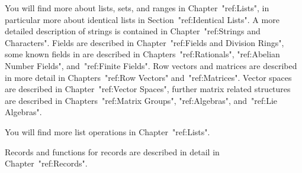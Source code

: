 \null

% 
% 
You will find more about lists, sets, and ranges in Chapter~"ref:Lists",
in particular more about identical lists in Section~"ref:Identical Lists".
% 
% 
% 
A more detailed description of strings is contained in
Chapter~"ref:Strings and Characters".
% 
% 
Fields are described in Chapter~"ref:Fields and Division Rings",
some known fields in {\GAP} are described in Chapters~"ref:Rationals",
"ref:Abelian Number Fields", and~"ref:Finite Fields".
Row vectors and matrices are described in more detail
in Chapters~"ref:Row Vectors" and~"ref:Matrices".
Vector spaces are described in Chapter~"ref:Vector Spaces",
further matrix related structures are described in
Chapters~"ref:Matrix Groups", "ref:Algebras", and~"ref:Lie Algebras".
% 

% 
You will find more list operations in Chapter~"ref:Lists".

Records and functions for records are described in detail
in Chapter~"ref:Records".


